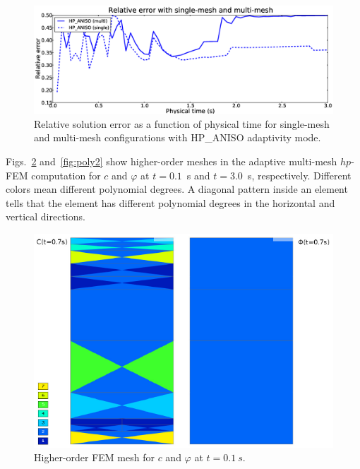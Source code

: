 \begin{figure}[!ht]
  \begin{centering}
  \includegraphics[width=\columnwidth]{singlemulti_error}
  \caption{\label{fig:singlemultierror} Relative solution error as a function 
  of physical time for single-mesh and multi-mesh configurations with 
  HP\_ANISO adaptivity mode.}
  \end{centering}
\end{figure}
\noindent 
Figs.~\ref{fig:poly} and~\ref{fig:poly2} show higher-order meshes in the adaptive multi-mesh $hp$-FEM
computation for $c$ and $\varphi$ at $t = 0.1$~s and $t=3.0$~s, respectively. Different 
colors mean different polynomial degrees. A diagonal pattern inside an element 
tells that the element has different polynomial degrees in the 
horizontal and vertical directions. 


\begin{figure}[!ht]
  \begin{centering}
  \includegraphics[width=.75\columnwidth]{poly}
  \caption{\label{fig:poly} Higher-order FEM mesh for 
  $c$ and $\varphi$ at $t=0.1\ s$. }
  \end{centering}
\end{figure}

